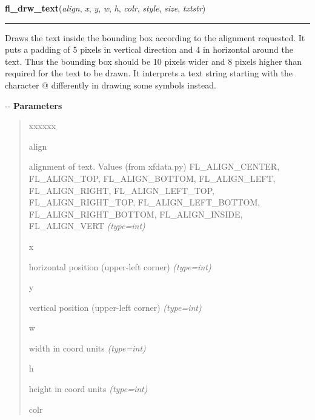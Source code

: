 \hspace{.8\funcindent}\begin{boxedminipage}{\funcwidth}

    \raggedright \textbf{fl\_drw\_text}(\textit{align}, \textit{x}, \textit{y}, \textit{w}, \textit{h}, \textit{colr}, \textit{style}, \textit{size}, \textit{txtstr})

    \vspace{-1.5ex}

    \rule{\textwidth}{0.5\fboxrule}
\setlength{\parskip}{2ex}

Draws the text inside the bounding box according to the alignment
requested. It puts a padding of 5 pixels in vertical direction and 4 in
horizontal around the text. Thus the bounding box should be 10 pixels wider
and 8 pixels higher than required for the text to be drawn. It interprets
a text string starting with the character @ differently in drawing some
symbols instead.

-{}-
\setlength{\parskip}{1ex}
      \textbf{Parameters}
      \vspace{-1ex}

      \begin{quote}
        \begin{Ventry}{xxxxxx}

          \item[align]


alignment of text. Values (from xfdata.py) FL\_ALIGN\_CENTER,
FL\_ALIGN\_TOP, FL\_ALIGN\_BOTTOM, FL\_ALIGN\_LEFT, FL\_ALIGN\_RIGHT,
FL\_ALIGN\_LEFT\_TOP, FL\_ALIGN\_RIGHT\_TOP, FL\_ALIGN\_LEFT\_BOTTOM,
FL\_ALIGN\_RIGHT\_BOTTOM, FL\_ALIGN\_INSIDE, FL\_ALIGN\_VERT
            {\it (type=int)}

          \item[x]


horizontal position (upper-left corner)
            {\it (type=int)}

          \item[y]


vertical position (upper-left corner)
            {\it (type=int)}

          \item[w]


width in coord units
            {\it (type=int)}

          \item[h]


height in coord units
            {\it (type=int)}

          \item[colr]



\end{Ventry}
\end{quote}
\end{boxedminipage}
